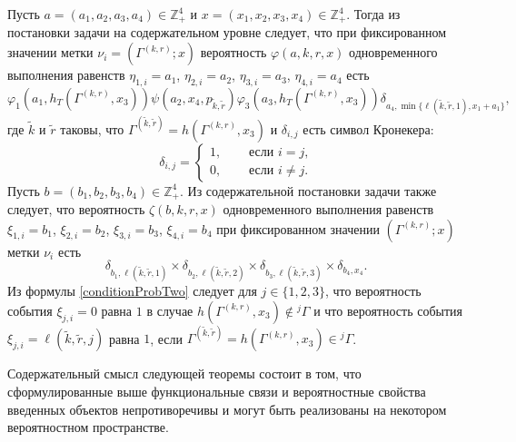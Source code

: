 \documentclass[12pt]{extarticle}
\theoremstyle{theorem}
\theoremstyle{remark}
\renewcommand{\Pr}{{\mathbf P}}
\begin{document}
Пусть $a=(a_1, a_2, a_3, a_4) \in \mathbb{Z}_+^4$ и $x=(x_1, x_2, x_3, x_4) \in \mathbb{Z}_+^4$. Тогда из постановки задачи на содержательном уровне следует, что при фиксированном значении метки $\nu_i=(\Gamma^{(k,r)}; x)$ вероятность $\varphi(a,k,r,x)$ одновременного выполнения равенств $\eta_{1,i}=a_1$, $\eta_{2,i}=a_2$, $\eta_{3,i}=a_3$, $\eta_{4,i}=a_4$ есть 
\begin{equation}
\varphi_1(a_1,h_T(\Gamma^{(k,r)},x_3)) \psi(a_2,x_4, p_{\tilde{k},\tilde{r}})  \varphi_3(a_3,h_T(\Gamma^{(k,r)},x_3))
 \delta_{a_4,\min{\{\ell(\tilde{k},\tilde{r},1), x_1+a_1}\}},
\label{conditionProbOne}
\end{equation}
где $\tilde{k}$ и $\tilde{r}$ таковы, что $\Gamma^{(\tilde{k},\tilde{r})}=h(\Gamma^{(k,r)},x_3)$ и $\delta_{i,j}$ есть символ Кронекера:
$$
\delta_{i,j}=
\begin{cases} 
1,& \quad \text{ если $i=j$,}\\
0,& \quad \text{ если $i\neq j$.}
\end{cases}
$$%
Пусть $b=(b_1, b_2, b_3, b_4) \in \mathbb{Z}_+^4$. Из содержательной постановки задачи также следует, что вероятность $\zeta(b, k, r, x)$ одновременного выполнения равенств $\xi_{1,i}=b_1$, $\xi_{2,i}=b_2$, $\xi_{3,i}=b_3$, $\xi_{4,i}=b_4$ при фиксированном значении $(\Gamma^{(k,r)}; x)$ метки $\nu_i$ есть
\begin{equation}
\delta_{b_1,\ell(\tilde{k},\tilde{r},1)} \times \delta_{b_2,\ell(\tilde{k},\tilde{r},2)} \times 
\delta_{b_3,\ell(\tilde{k},\tilde{r},3)} \times \delta_{b_4,x_4}.
\label{conditionProbTwo}
\end{equation}
Из формулы \eqref{conditionProbTwo} следует для $j\in \{1, 2, 3\}$, что вероятность события $\xi_{j,i}=0$ равна $1$ в случае $h(\Gamma^{(k,r)},x_3)\notin {}^j\Gamma$ и что вероятность события $\xi_{j,i}=\ell(\tilde{k},\tilde{r},j)$ равна $1$, если $\Gamma^{(\tilde{k},\tilde{r})}=h(\Gamma^{(k,r)},x_3)\in {}^j\Gamma$.


Содержательный смысл следующей теоремы состоит в том, что сформулированные выше функциональные связи и вероятностные свойства введенных объектов непротиворечивы и могут быть реализованы на некотором вероятностном пространстве.
\end{document}
